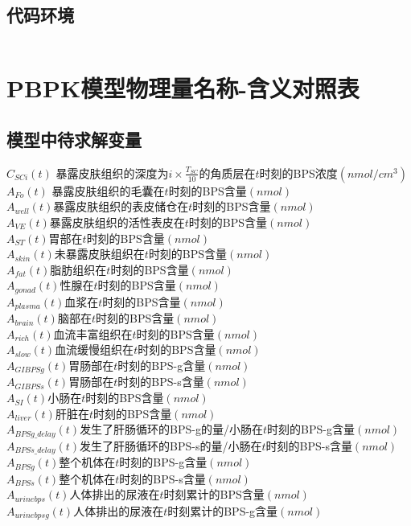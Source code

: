 \documentclass[a4paper,punct=banjiao,twoside]{ctexrep}
\theoremstyle{plain}
\theoremstyle{definition}
\theoremstyle{remark}
\begin{document}
\section{代码环境}
\begin{lstlisting}[language=PYTHON]

\end{lstlisting}
\chapter{PBPK模型物理量名称-含义对照表}
\section*{模型中待求解变量}
\label{app:B}
\noindent$C_{SCi}(t)$  {\hfill 暴露皮肤组织的深度为$i\times \frac{T_{SC}}{10}$的角质层在$t$时刻的BPS浓度$(nmol/cm^3)$}\\
$A_{Fo}(t)$ {\hfill  暴露皮肤组织的毛囊在$t$时刻的BPS含量$(nmol)$}\\
$A_{well}(t)${\hfill 暴露皮肤组织的表皮储仓在$t$时刻的BPS含量$(nmol)$}\\
$A_{VE}(t)${\hfill 暴露皮肤组织的活性表皮在$t$时刻的BPS含量$(nmol)$}\\
$A_{ST}(t)${\hfill 胃部在$t$时刻的BPS含量$(nmol)$}\\
$A_{skin}(t)${\hfill 未暴露皮肤组织在$t$时刻的BPS含量$(nmol)$}\\
$A_{fat}(t)${\hfill 脂肪组织在$t$时刻的BPS含量$(nmol)$}\\
$A_{gonad}(t)${\hfill 性腺在$t$时刻的BPS含量$(nmol)$}\\
$A_{plasma}(t)${\hfill 血浆在$t$时刻的BPS含量$(nmol)$}\\
$A_{brain}(t)${\hfill 脑部在$t$时刻的BPS含量$(nmol)$}\\
$A_{rich}(t)${\hfill 血流丰富组织在$t$时刻的BPS含量$(nmol)$}\\
$A_{slow}(t)${\hfill 血流缓慢组织在$t$时刻的BPS含量$(nmol)$}\\
$A_{GIBPSg}(t)${\hfill 胃肠部在$t$时刻的BPS-g含量$(nmol)$}\\
$A_{GIBPSs}(t)${\hfill 胃肠部在$t$时刻的BPS-s含量$(nmol)$}\\
$A_{SI}(t)${\hfill 小肠在$t$时刻的BPS含量$(nmol)$}\\
$A_{liver}(t)${\hfill 肝脏在$t$时刻的BPS含量$(nmol)$}\\
$A_{BPSg\_delay}(t)${\hfill 发生了肝肠循环的BPS-g的量/小肠在$t$时刻的BPS-g含量$(nmol)$}\\
$A_{BPSs\_delay}(t)${\hfill 发生了肝肠循环的BPS-s的量/小肠在$t$时刻的BPS-s含量$(nmol)$}\\
$A_{BPSg}(t)${\hfill 整个机体在$t$时刻的BPS-g含量$(nmol)$}\\
$A_{BPSs}(t)${\hfill 整个机体在$t$时刻的BPS-s含量$(nmol)$}\\
$A_{urinebps}(t)${\hfill 人体排出的尿液在$t$时刻累计的BPS含量$(nmol)$}\\
$A_{urinebpsg}(t)${\hfill  人体排出的尿液在$t$时刻累计的BPS-g含量$(nmol)$}
\end{document}
